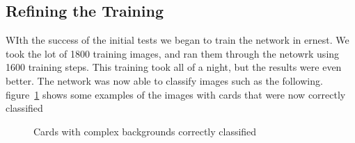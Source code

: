 \documentclass[letterpaper]{article}
\begin{document}
\subsection{Refining the Training}
WIth the success of the initial tests we began to train the network in ernest.  We took the lot of 1800 training images, and ran them through the netowrk using 1600 training steps.  This training took all of a night, but the results were even better.  The network was now able to classify images such as the following.  figure~\ref{fig:refining_results_1} shows some examples of the images with cards that were now correctly classified

\begin{figure}[!tbp]
  \centering

  \caption{\label{fig:refining_results_1} Cards with complex backgrounds correctly classified}
\end{figure}
\end{document}
